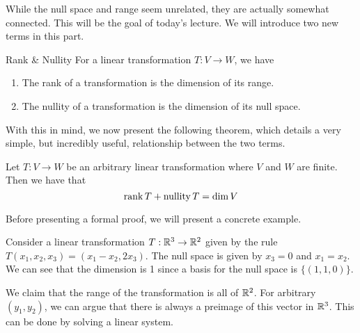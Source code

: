 \documentclass[main.tex]{subfiles}
\begin{document}
    While the null space and range seem unrelated, they are actually somewhat connected. This will be the goal of today's lecture. We will introduce two new terms in this part. 
    \begin{defn}{Rank \& Nullity}{}
        For a linear transformation $T: V\to W$, we have 
        \begin{enumerate}
            \item The rank of a transformation is the dimension of its range. 
            \item The nullity of a transformation is the dimension of its null space.
        \end{enumerate}
    \end{defn}
    With this in mind, we now present the following theorem, which details a very simple, but incredibly useful, relationship between the two terms. 
    \begin{thrm}{}{}
        Let $T:V\to W$ be an arbitrary linear transformation where $V$ and $W$ are finite. Then we have that 
        \begin{equation}
            \operatorname{rank} T + \operatorname{nullity} T = \operatorname{dim} V
        \end{equation}
    \end{thrm}
    Before presenting a formal proof, we will present a concrete example. 
    \begin{example}{}{}
        Consider a linear transformation $T: \mathbb{R}^3 \to \mathbb{R}^2$ given by the rule $T(x_1, x_2, x_3) = (x_1 - x_2, 2x_3)$. The null space is given by $x_3=0$ and $x_1 = x_2$. We can see that the dimension is 1 since a basis for the null space is $\{(1, 1, 0)\}$. \bigbreak 

        We claim that the range of the transformation is all of $\mathbb{R}^2$. For arbitrary $(y_1, y_2)$, we can argue that there is always a preimage of this vector in $\mathbb{R}^3$. This can be done by solving a linear system. 
    \end{example}
\end{document}
